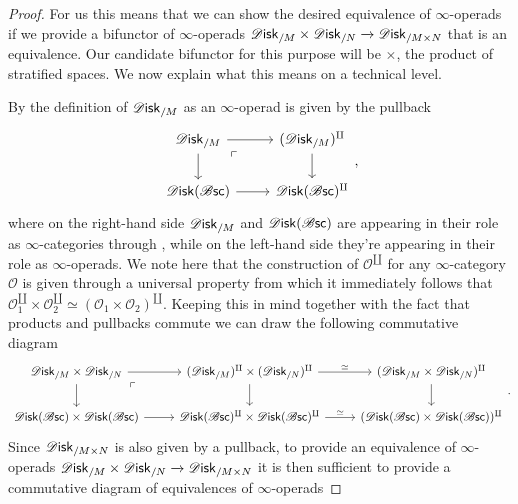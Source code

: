 \documentclass[../text.tex]{subfiles}
\begin{document}
\begin{proof}
    For us this means that we can show the desired equivalence of $\infty$-operads if we provide a bifunctor of $\infty$-operads $\disk_{/M} \times \disk_{/N} \xrightarrow{} \disk_{/M \times N}$ that is an equivalence. Our candidate bifunctor for this purpose will be $\times$, the product of stratified spaces. We now explain what this means on a technical level.

    By  the definition of $\disk_{/M}$ as an $\infty$-operad is given by the pullback
    \begin{equation}
        \begin{tikzcd}
            \disk_{/M} \arrow[rd, phantom, "\ulcorner", very near start] \arrow[r] \arrow[d] & (\disk_{/M})^{\amalg} \arrow[d] \\
            \disk(\bsc) \arrow[r] & \disk(\bsc)^{\amalg}
        \end{tikzcd},
    \end{equation}
    where on the right-hand side $\disk_{/M}$ and $\disk(\bsc)$ are appearing in their role as $\infty$-categories through \cite[Con.2.4.3.1]{lurie_ha}, while on the left-hand side they're appearing in their role as $\infty$-operads. We note here that the construction of $\mathscr{O}^{\amalg}$ for any $\infty$-category $\mathscr{O}$ is given through a universal property from which it immediately follows that $\mathscr{O}_1^{\amalg} \times \mathscr{O}_2^{\amalg} \simeq (\mathscr{O}_1 \times \mathscr{O}_2)^{\amalg}$. Keeping this in mind together with the fact that products and pullbacks commute we can draw the following commutative diagram
    \begin{equation}
        \begin{tikzcd}[column sep = 25]
            \disk_{/M} \times \disk_{/N} \arrow[rd, phantom, "\ulcorner", very near start] \arrow[r] \arrow[d] & (\disk_{/M})^{\amalg} \times (\disk_{/N})^{\amalg} \arrow[r, "\simeq"] \arrow[d] & (\disk_{/M} \times \disk_{/N})^{\amalg} \arrow[d] \\
            \disk(\bsc) \times \disk(\bsc) \arrow[r] & \disk(\bsc)^{\amalg} \times \disk(\bsc)^{\amalg} \arrow[r, "\simeq"] & (\disk(\bsc) \times \disk(\bsc))^{\amalg}  
        \end{tikzcd}.
    \end{equation}
    Since $\disk_{/M \times N}$ is also given by a pullback, to provide an equivalence of $\infty$-operads $\disk_{/M} \times \disk_{/N} \xrightarrow{} \disk_{/M \times N}$ it is then sufficient to provide a commutative diagram of equivalences of $\infty$-operads

\end{proof}
\end{document}
